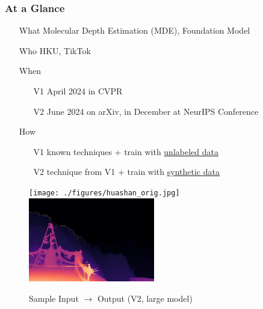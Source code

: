 \documentclass[12pt]{beamer}
\begin{document}
\begin{frame}
    \frametitle{At a Glance}

    \begin{itemize}
        \item[What] Molecular Depth Estimation (MDE), Foundation Model
        \item[Who] HKU, TikTok
        \item[When]
        \begin{itemize}
            \item[V1] April 2024 in CVPR
            \item[V2] June 2024 on arXiv, in December at NeurIPS Conference
        \end{itemize}
        \item[How]
        \begin{itemize}
            \item[V1] known techniques + train with \underline{unlabeled data}
            \item[V2] technique from V1 + train with \underline{synthetic data}
        \end{itemize}
    \end{itemize}
    
    \begin{figure}
        \centering
        \texttt{[image: ./figures/huashan\_orig.jpg]}
        \includegraphics[width=0.49\textwidth]{./figures/huashan_depthmap.png}
        \caption{Sample Input $\to$ Output (V2, large model)}
        \label{fig:intro}
    \end{figure}

\end{frame}
\end{document}
